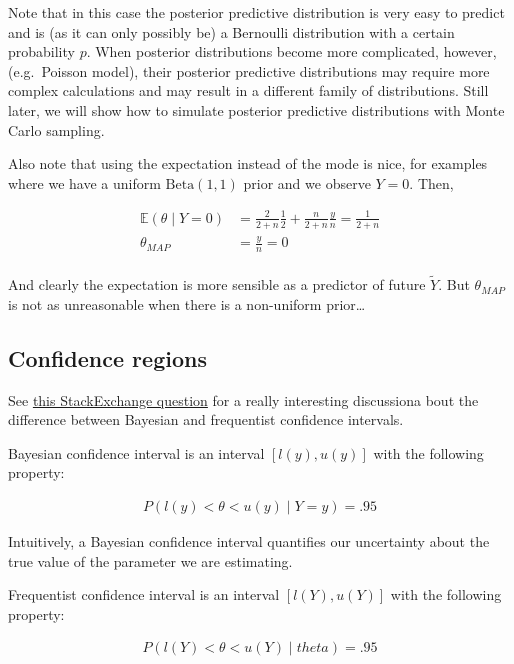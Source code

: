 \documentclass[]{article}
\begin{document}
Note that in this case the posterior predictive distribution is very
easy to predict and is (as it can only possibly be) a Bernoulli
distribution with a certain probability \(p\). When posterior
distributions become more complicated, however, (e.g.~Poisson model),
their posterior predictive distributions may require more complex
calculations and may result in a different family of distributions.
Still later, we will show how to simulate posterior predictive
distributions with Monte Carlo sampling.

Also note that using the expectation instead of the mode is nice, for
examples where we have a uniform \(\text{Beta}(1, 1)\) prior and we
observe \(Y = 0\). Then,

\begin{align}
\mathbb{E}(\theta \mid Y = 0) &= \frac{2}{2 + n}\frac{1}{2} + \frac{n}{2 +
n}\frac{y}{n} = \frac{1}{2 + n}\\
\theta_{MAP} &= \frac{y}{n} = 0 \\
\end{align}

And clearly the expectation is more sensible as a predictor of future
\(\tilde{Y}\). But \(\theta_{MAP}\) is not as unreasonable when there is
a non-uniform prior\ldots{}

\hypertarget{confidence-regions}{%
\subsection{Confidence regions}\label{confidence-regions}}

See
\href{http://stats.stackexchange.com/questions/2272/whats-the-difference-between-a-confidence-interval-and-a-credible-interval}{this
StackExchange question} for a really interesting discussiona bout the
difference between Bayesian and frequentist confidence intervals.

Bayesian confidence interval is an interval \([l(y), u(y)]\) with the
following property:

\begin{align}
P(l(y) < \theta < u(y) \mid Y = y) = .95
\end{align}

Intuitively, a Bayesian confidence interval quantifies our uncertainty
about the true value of the parameter we are estimating.

Frequentist confidence interval is an interval \([l(Y), u(Y)]\) with the
following property:

\begin{align}
P(l(Y) < \theta < u(Y) \mid theta) = .95
\end{align}
\end{document}
